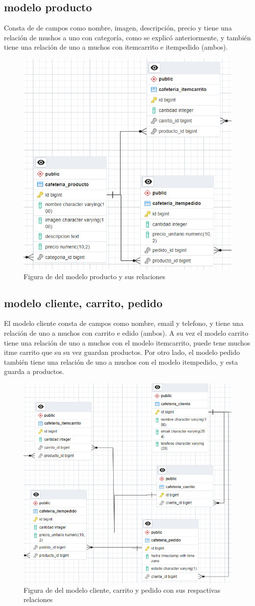 \documentclass{article}
\begin{document}
	\subsection{modelo producto}
	Consta de de campos como nombre, imagen, descripción, precio y tiene una relación de mushos a uno con categoría, como se explicó anteriormente, y también tiene una relación de uno a muchos con itemcarrito e itempedido (ambos).
	\begin{figure}[h!]
		\centering
		\includegraphics[width=0.5\linewidth]{img/modProducto}
		\caption{Figura de del modelo producto y sus relaciones}
		\label{fig:modproducto}
	\end{figure}
	\newpage
	\subsection{modelo cliente, carrito, pedido}
	El modelo cliente consta de campos como nombre, email y telefono, y tiene  una relación de uno a muchos con carrito e edido (ambos). A su vez el modelo carrito tiene una relación de uno a muchos con el modelo itemcarrito, puede tene muchos itme carrito que su su vez guardan productos. Por otro lado, el modelo pedido también tiene una relación de uno a muchos con el modelo itempedido, y esta guarda a productos.
	\begin{figure}[h!]
		\centering
		\includegraphics[width=0.5\linewidth]{img/modClienteotros}
		\caption{Figura de del modelo cliente, carrito y pedido con sus respactivas relaciones}
		\label{fig:modclienteotros}
	\end{figure}
	\newpage
\end{document}
